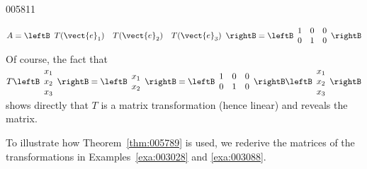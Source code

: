 \begin{example}{}{005811}
\begin{solution}
\begin{equation*}
A = \leftB \begin{array}{ccc}
T(\vect{e}_{1}) & T(\vect{e}_{2}) & T(\vect{e}_{3})
\end{array} \rightB = \leftB \begin{array}{ccc}
1 & 0 & 0 \\
0 & 1 & 0
\end{array} \rightB
\end{equation*}
Of course, the fact that $T \leftB \begin{array}{c}
x_{1} \\
x_{2} \\
x_{3}
\end{array} \rightB = \leftB \begin{array}{c}
x_{1} \\
x_{2}
\end{array} \rightB = \leftB \begin{array}{ccc}
1 & 0 & 0 \\
0 & 1 & 0
\end{array} \rightB \leftB \begin{array}{c}
x_{1} \\
x_{2} \\
x_{3}
\end{array} \rightB$
 shows directly that $T$ is a matrix transformation (hence linear) and reveals the matrix.
\end{solution}
\end{example}

To illustrate how Theorem~\ref{thm:005789} is used, we rederive the matrices of the transformations in Examples~\ref{exa:003028} and \ref{exa:003088}.

